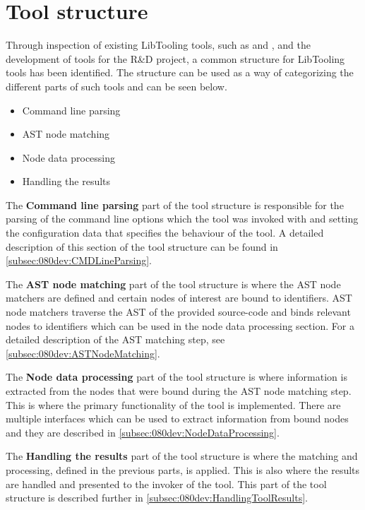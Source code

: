 \section{Tool structure} \label{sec:080dev:tool_structure}

Through inspection of existing LibTooling tools, such as \cite{clangExternalClangExamples} and \cite{llvmLLVMCompilerInfrastructure2023}, and the development of tools for the R\&D project, a common structure for LibTooling tools has been identified. The structure can be used as a way of categorizing the different parts of such tools and can be seen below.

\begin{itemize}
    \item Command line parsing
    \item AST node matching
    \item Node data processing
    \item Handling the results
\end{itemize}

The \textbf{Command line parsing} part of the tool structure is responsible for the parsing of the command line options which the tool was invoked with and setting the configuration data that specifies the behaviour of the tool. A detailed description of this section of the tool structure can be found in \cref{subsec:080dev:CMDLineParsing}.

The \textbf{AST node matching} part of the tool structure is where the AST node matchers are defined and certain nodes of interest are bound to identifiers. AST node matchers traverse the AST of the provided source-code and binds relevant nodes to identifiers which can be used in the node data processing section. For a detailed description of the AST matching step, see \cref{subsec:080dev:ASTNodeMatching}.

The \textbf{Node data processing} part of the tool structure is where information is extracted from the nodes that were bound during the AST node matching step. This is where the primary functionality of the tool is implemented. There are multiple interfaces which can be used to extract information from bound nodes and they are described in \cref{subsec:080dev:NodeDataProcessing}.

The \textbf{Handling the results} part of the tool structure is where the matching and processing, defined in the previous parts, is applied. This is also where the results are handled and presented to the invoker of the tool. This part of the tool structure is described further in \cref{subsec:080dev:HandlingToolResults}.


